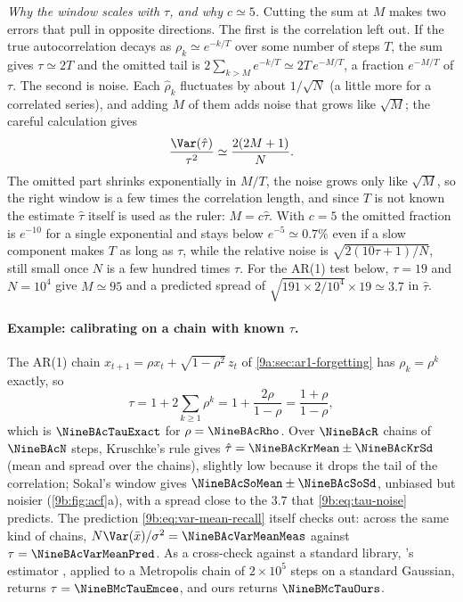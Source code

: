 \emph{Why the window scales with $\tau$, and why $c\simeq5$.} Cutting the sum at $M$ makes two
errors that pull in opposite directions. The first is the correlation left out. If the true
autocorrelation decays as $\rho_k\simeq e^{-k/T}$ over some number of steps $T$, the sum gives
$\tau\simeq2T$ and the omitted tail is $2\sum_{k>M}e^{-k/T}\simeq2T\,e^{-M/T}$, a fraction
$e^{-M/T}$ of $\tau$. The second is noise. Each $\hat\rho_k$ fluctuates by about $1/\sqrt N$ (a
little more for a correlated series), and adding $M$ of them adds noise that grows like
$\sqrt M$; the careful calculation \parencite{Sokal1997} gives
\begin{equation}
  \frac{\Var(\hat\tau)}{\tau^2}\simeq\frac{2(2M+1)}{N}.
  \label{9b:eq:tau-noise}
\end{equation}
The omitted part shrinks exponentially in $M/T$, the noise grows only like $\sqrt M$, so the
right window is a few times the correlation length, and since $T$ is not known the estimate
$\hat\tau$ itself is used as the ruler: $M=c\hat\tau$. With $c=5$ the omitted fraction is
$e^{-10}$ for a single exponential and stays below $e^{-5}\simeq0.7\%$ even if a slow component
makes $T$ as long as $\tau$, while the relative noise is $\sqrt{2(10\tau+1)/N}$, still small once
$N$ is a few hundred times $\tau$. For the AR(1) test below, $\tau=19$ and $N=10^4$ give
$M\simeq95$ and a predicted spread of $\sqrt{191\times2/10^4}\times19\simeq3.7$ in $\hat\tau$.


\paragraph{Example: calibrating on a chain with known $\tau$.}
The AR(1) chain $x_{t+1}=\rho x_t+\sqrt{1-\rho^2}\,z_t$ of \cref{9a:sec:ar1-forgetting} has
$\rho_k=\rho^k$ exactly, so
\begin{equation*}
  \tau=1+2\sum_{k\ge1}\rho^k=1+\frac{2\rho}{1-\rho}=\frac{1+\rho}{1-\rho},
\end{equation*}
which is $\NineBAcTauExact$ for $\rho=\NineBAcRho$. Over $\NineBAcR$ chains of $\NineBAcN$ steps,
Kruschke's rule gives $\hat\tau=\NineBAcKrMean\pm\NineBAcKrSd$ (mean and spread over the
chains), slightly low because it drops the tail of the correlation; Sokal's window gives
$\NineBAcSoMean\pm\NineBAcSoSd$, unbiased but noisier (\cref{9b:fig:acf}a), with a spread close
to the $3.7$ that \eqref{9b:eq:tau-noise} predicts. The prediction
\eqref{9b:eq:var-mean-recall} itself checks out: across the same kind of chains,
$N\Var(\bar x)/\sigma^2=\NineBAcVarMeanMeas$ against $\tau=\NineBAcVarMeanPred$. As a cross-check
against a standard library, 's estimator , applied to a
Metropolis chain of $2\times10^5$ steps on a standard Gaussian, returns $\tau=\NineBMcTauEmcee$,
and ours returns $\NineBMcTauOurs$.

